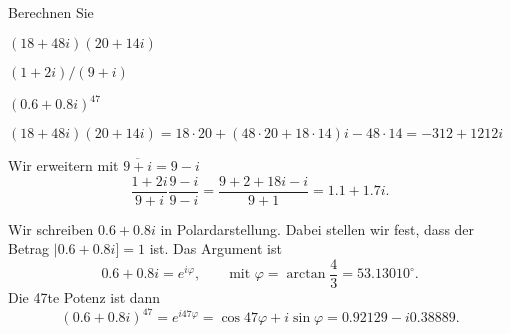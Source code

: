 Berechnen Sie
\begin{teilaufgaben}
\item
$(18 + 48i)(20 + 14i)$
\item
$(1+2i)/(9+i)$
\item
$(0.6 + 0.8i)^{47}$
\end{teilaufgaben}

\begin{loesung}
\begin{teilaufgaben}
\item 
$
(18 + 48i)(20 + 14i)
=
18\cdot 20 + (48\cdot 20+18\cdot 14)i-48\cdot 14
=
-312+1212i$
\item Wir erweitern mit $\overline{9+i}=9-i$
\[
\frac{1+2i}{9+i}\frac{9-i}{9-i}
=
\frac{9+2+18i-i}{9+1}
=
1.1+1.7i.
\]
\item
Wir schreiben $0.6+0.8i$ in Polardarstellung.
Dabei stellen wir fest, dass der Betrag $|0.6+0.8i]=1$ ist. Das Argument ist
\[
0.6+0.8i=
e^{i\varphi},\qquad\text{mit $\varphi=\arctan\frac43=53.13010^\circ$}.
\]
Die 47te Potenz ist dann
\[
(0.6+0.8i)^{47}=e^{i47\varphi}
=\cos 47\varphi+i\sin\varphi
=0.92129 - i0.38889.
\]
\end{teilaufgaben}
\end{loesung}


